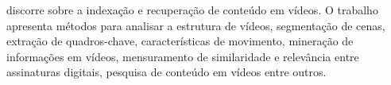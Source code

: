 \citeauthor{hu2011survey} discorre sobre a indexação e recuperação de conteúdo em vídeos. O trabalho apresenta métodos para analisar a estrutura de vídeos, segmentação de cenas, extração de quadros-chave, características de movimento, mineração de informações em vídeos, mensuramento de similaridade e relevância entre assinaturas digitais, pesquisa de conteúdo em vídeos entre outros.

